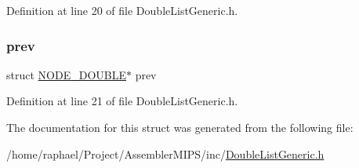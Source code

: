 Definition at line 20 of file Double\+List\+Generic.\+h.

\mbox{\label{struct_n_o_d_e___d_o_u_b_l_e_ab2e51de298c76c1fb2c6851a07859ecd}} 
\subsubsection{\texorpdfstring{prev}{prev}}
{\footnotesize\ttfamily struct \mbox{\hyperlink{struct_n_o_d_e___d_o_u_b_l_e}{N\+O\+D\+E\+\_\+\+D\+O\+U\+B\+LE}}$\ast$ prev}



Definition at line 21 of file Double\+List\+Generic.\+h.



The documentation for this struct was generated from the following file\+:\begin{DoxyCompactItemize}
\item 
/home/raphael/\+Project/\+Assembler\+M\+I\+P\+S/inc/\mbox{\hyperlink{_double_list_generic_8h}{Double\+List\+Generic.\+h}}\end{DoxyCompactItemize}
